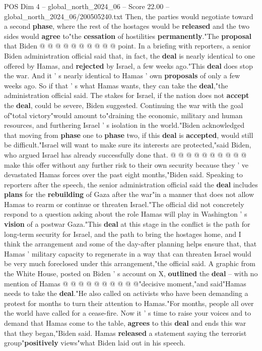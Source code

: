 \begin{textsample}{POS Dim 4 – global\_north\_2024\_06 – Score 22.00 – global\_north\_2024\_06/200505240.txt}
Then, the parties would negotiate toward a second \textbf{phase}, where the rest of the hostages would be \textbf{released} and the two sides would \textbf{agree} to"the \textbf{cessation} of hostilities \textbf{permanently}."The \textbf{proposal} that Biden @ @ @ @ @ @ @ @ @ @ point.
In a briefing with reporters, a senior Biden administration official said that, in fact, the \textbf{deal} is nearly identical to one offered by Hamas, and \textbf{rejected} by Israel, a few weeks ago."This \textbf{deal} does stop the war.
And it ' s nearly identical to Hamas ' own \textbf{proposals} of only a few weeks ago.
So if that ' s what Hamas wants, they can take the \textbf{deal},"the administration official said.
The stakes for Israel, if the nation does not \textbf{accept} the \textbf{deal}, could be severe, Biden suggested.
Continuing the war with the goal of"total victory"would amount to"draining the economic, military and human resources, and furthering Israel ' s isolation in the world."Biden acknowledged that moving from \textbf{phase} one to \textbf{phase} two, if this \textbf{deal} is \textbf{accepted}, would still be difficult."Israel will want to make sure its interests are protected,"said Biden, who argued Israel has already successfully done that. @ @ @ @ @ @ @ @ @ @ make this offer without any further risk to their own security because they ' ve devastated Hamas forces over the past eight months,"Biden said.
Speaking to reporters after the speech, the senior administration official said the \textbf{deal} includes \textbf{plans} for the \textbf{rebuilding} of Gaza after the war"in a manner that does not allow Hamas to rearm or continue or threaten Israel."The official did not concretely respond to a question asking about the role Hamas will play in Washington ' s \textbf{vision} of a postwar Gaza."This \textbf{deal} at this stage in the conflict is the path for long-term security for Israel, and the path to bring the hostages home, and I think the arrangement and some of the day-after planning helps ensure that, that Hamas ' military capacity to regenerate in a way that can threaten Israel would be very much foreclosed under this arrangement,"the official said.
A graphic from the White House, posted on Biden ' s account on X, \textbf{outlined} the \textbf{deal} -- with no mention of Hamas @ @ @ @ @ @ @ @ @ @"decisive moment,"and said"Hamas needs to take the \textbf{deal}."He also called on activists who have been demanding a protest for months to turn their attention to Hamas."For months, people all over the world have called for a cease-fire.
Now it ' s time to raise your voices and to demand that Hamas come to the table, \textbf{agrees} to this \textbf{deal} and ends this war that they began,"Biden said.
Hamas \textbf{released} a statement saying the terrorist group"\textbf{positively} views"what Biden laid out in his speech.

\end{textsample}
